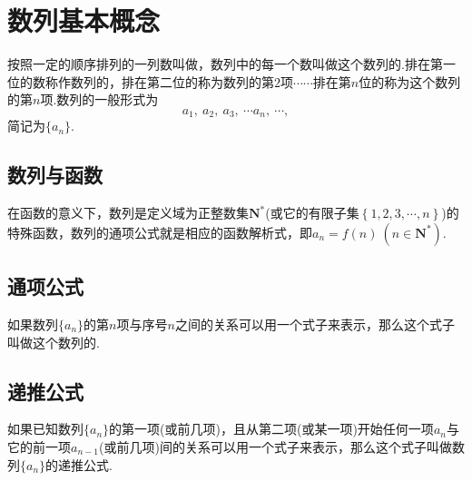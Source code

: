   \Teach{}
  \newtheorem*{Theorem}{定理}
  \makefront
\vspace{-1.5em}

\startexercise
\section{数列基本概念}
  按照一定的顺序排列的一列数叫做，数列中的每一个数叫做这个数列的.排在第一位的数称作数列的，排在第二位的称为数列的第$ 2 $项$ \cdots\cdots $排在第$ n $位的称为这个数列的第$ n $项.数列的一般形式为\[a_1,~a_2,~a_3,~\cdots a_n,~\cdots, \]简记为$ \{a_n\} $.
  \subsection{数列与函数}
    在函数的意义下，数列是定义域为正整数集$ \mathbf{N^*} $(或它的有限子集$ \left\{1,2,3,\cdots,n\right\} $)的特殊函数，数列的通项公式就是相应的函数解析式，即$ a_n=f(n)~(n\in\mathbf{N^*}) $.
  \subsection{通项公式}
    如果数列$\{a_n\}$的第$ n $项与序号$ n $之间的关系可以用一个式子来表示，那么这个式子叫做这个数列的.
  \subsection{递推公式}
    如果已知数列$\{a_n\}$的第一项(或前几项)，且从第二项(或某一项)开始任何一项$ a_n $与它的前一项$ a_{n-1} $(或前几项)间的关系可以用一个式子来表示，那么这个式子叫做数列$\{a_n\}$的递推公式.
